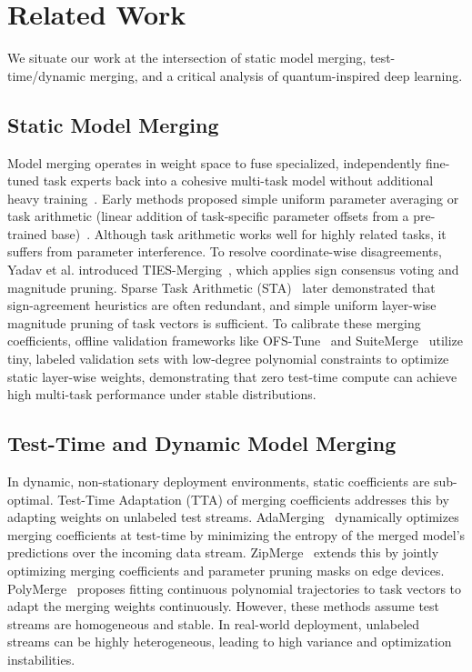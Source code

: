 \section{Related Work}
\label{sec:related_work}

We situate our work at the intersection of static model merging, test-time/dynamic merging, and a critical analysis of quantum-inspired deep learning.

\subsection{Static Model Merging}
Model merging operates in weight space to fuse specialized, independently fine-tuned task experts back into a cohesive multi-task model without additional heavy training~\cite{wortsman2022model}. Early methods proposed simple uniform parameter averaging or task arithmetic (linear addition of task-specific parameter offsets from a pre-trained base)~\cite{ilharco2022editing}. Although task arithmetic works well for highly related tasks, it suffers from parameter interference. To resolve coordinate-wise disagreements, Yadav et al. introduced TIES-Merging~\cite{yadav2023ties}, which applies sign consensus voting and magnitude pruning. Sparse Task Arithmetic (STA)~\cite{sta} later demonstrated that sign-agreement heuristics are often redundant, and simple uniform layer-wise magnitude pruning of task vectors is sufficient. To calibrate these merging coefficients, offline validation frameworks like OFS-Tune~\cite{ofstune} and SuiteMerge~\cite{suitemerge} utilize tiny, labeled validation sets with low-degree polynomial constraints to optimize static layer-wise weights, demonstrating that zero test-time compute can achieve high multi-task performance under stable distributions.

\subsection{Test-Time and Dynamic Model Merging}
In dynamic, non-stationary deployment environments, static coefficients are sub-optimal. Test-Time Adaptation (TTA) of merging coefficients addresses this by adapting weights on unlabeled test streams. AdaMerging~\cite{adamerging} dynamically optimizes merging coefficients at test-time by minimizing the entropy of the merged model's predictions over the incoming data stream. ZipMerge~\cite{zipmerge} extends this by jointly optimizing merging coefficients and parameter pruning masks on edge devices. PolyMerge~\cite{polymerge} proposes fitting continuous polynomial trajectories to task vectors to adapt the merging weights continuously. However, these methods assume test streams are homogeneous and stable. In real-world deployment, unlabeled streams can be highly heterogeneous, leading to high variance and optimization instabilities. 

